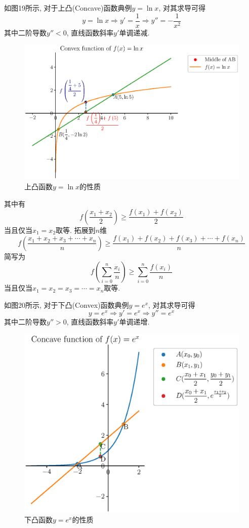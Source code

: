 \documentclass{book}
\begin{document}
    如图19所示, 对于上凸(Concave)函数典例$y=\ln x$, 对其求导可得$$y=\ln x\Longrightarrow y'=\frac{1}{x}\Longrightarrow y''=-\frac{1}{x^2}$$其中二阶导数$y''<0$, 直线函数斜率$y'$单调递减.

    \begin{figure}[htbp]
        \centering
        \includegraphics[width=\textwidth]{img/ConvexFunctionIntro.eps}
        \caption{上凸函数$\displaystyle y=\ln x$的性质}
    \end{figure}

    其中有$$f\left( \frac{x_1+x_2}{2} \right)\ge \frac{f\left( x_1 \right)+f\left( x_2 \right)}{2}$$当且仅当$x_1=x_2$取等. 拓展到$n$维$$f\left( \frac{x_1+x_2+x_3+\cdots+x_n}{n} \right)\ge \frac{f(x_1)+f(x_2)+f(x_3)+\cdots+f(x_n)}{n}$$简写为$$f\left( \sum_{i=0}^{n}\frac{x_i }{n} \right)\ge \sum_{i=0}^{n}\frac{f(x_i) }{n}$$当且仅当$x_1=x_2=x_3=\cdots=x_n$取等.

    如图20所示, 对于下凸(Convex)函数典例$y=e^x$, 对其求导可得$$y=e^x\Longrightarrow y'=e^x\Longrightarrow y''=e^x$$其中二阶导数$y''>0$, 直线函数斜率$y'$单调递增.

    \begin{figure}[htbp]
        \centering
        \includegraphics[width=\textwidth]{img/ConcaveFunctionIntro.eps}
        \caption{下凸函数$\displaystyle y=e^x$的性质}
    \end{figure}
\end{document}
